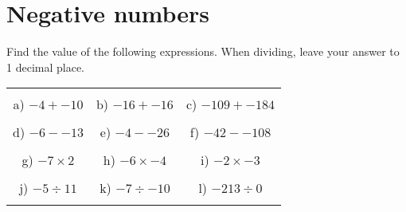 \documentclass[12pt]{article}
\begin{document}
\pagestyle{fancy}
\fancyfoot{} 
\section{Negative numbers}
Find the value of the following expressions. When dividing, leave your answer to 1 decimal place.
\begin{table}[h!]
\centering
\begin{tabular}{c c c}
\hspace{5cm} & \hspace{5cm} & \hspace{5cm} \\
a) ${-4} + {-10}$ & b) ${-16} + {-16}$ & c) ${-109} + {-184}$ \\ \\
d) ${-6} - {-13}$ & e) ${-4} - {-26}$ & f) ${-42} - {-108}$ \\ \\
g) ${-7}\times{2}$ & h) ${-6}\times{-4}$ & i) ${-2}\times{-3}$ \\ \\
j) ${-5}\div{11}$ & k) ${-7}\div{-10}$ & l) ${-213}\div{0}$ \\ \\
\end{tabular}
\end{table}
\newline
\end{document}
